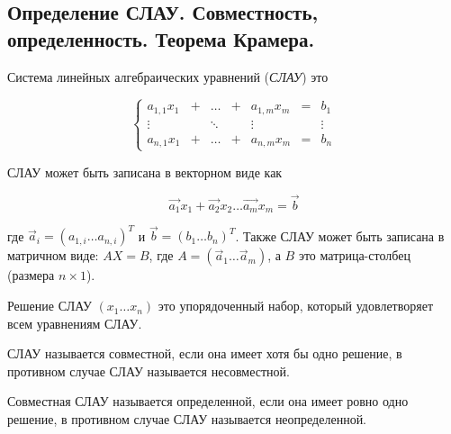 \subsection{%
  Определение СЛАУ. Совместность, определенность. Теорема Крамера.%
}

\begin{definition}
  Система линейных алгебраических уравнений (\textit{СЛАУ}) это
  
  \begin{equation*}
    \left\{
      \begin{array}{clclclclc}
        a_{1, 1} x_1 & + & \dotsc & + & a_{1, m} x_m & = & b_1
      \\
        \vdots       &   & \ddots &   & \vdots       &   & \vdots
      \\
        a_{n, 1} x_1 & + & \dotsc & + & a_{n, m} x_m & = & b_n
      \end{array}
    \right.
  \end{equation*}
\end{definition}

\begin{remark}
  СЛАУ может быть записана в векторном виде как
  
  \begin{equation*}
    \vec{a_1} x_1 + \vec{a_2} x_2 \dotsc \vec{a_m} x_m = \vec{b}
  \end{equation*}
  
  где \(\vec{a}_i = (a_{1, i} \dotsc a_{n, i})^T\) и \(\vec{b} = (b_1 \dotsc
  b_n)^T\). Также  СЛАУ может быть записана в матричном виде: \(AX = B\), где
  \(A = (\vec{a}_1 \dotsc \vec{a}_m)\), а \(B\) это матрица-столбец (размера \(n
  \times 1\)).
\end{remark}

\begin{definition}
  Решение СЛАУ \((x_1 \dotsc x_n)\) это упорядоченный набор, который
  удовлетворяет всем уравнениям СЛАУ.
\end{definition}

\begin{definition}
  СЛАУ называется совместной, если она имеет хотя бы одно решение, в противном
  случае СЛАУ называется несовместной.
\end{definition}

\begin{definition}
  Совместная СЛАУ называется определенной, если она имеет ровно одно решение, в
  противном случае СЛАУ называется неопределенной.
\end{definition}

